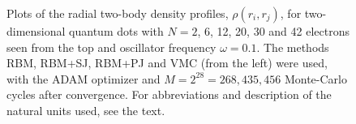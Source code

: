 \begin{landscape}
\begin{figure}[H]
		\hspace{0.1cm}
		
		\caption{Plots of the radial two-body density profiles, $\rho(r_i, r_j)$, for two-dimensional quantum dots with $N=2$, 6, 12, 20, 30 and 42 electrons seen from the top and oscillator frequency $\omega=0.1$. The methods RBM, RBM+SJ, RBM+PJ and VMC (from the left) were used, with the ADAM optimizer and $M=2^{28}=268,435,456$ Monte-Carlo cycles after convergence. For abbreviations and description of the natural units used, see the text.}%
		\label{fig:TB_2D_0p1w}
	\end{figure}
	

\end{landscape}
